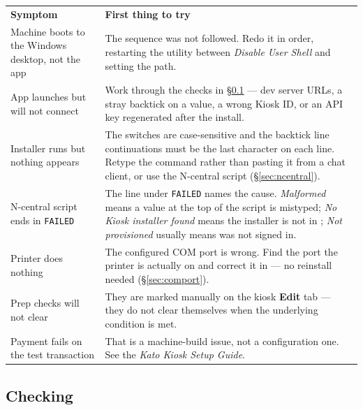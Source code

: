 \documentclass[a4paper,10pt]{article}
\begin{document}
\begin{center}
\renewcommand{\arraystretch}{1.35}\small
\begin{tabularx}{\textwidth}{L{50mm} X}
\color{white}\textbf{Symptom} &
\color{white}\textbf{First thing to try}\\
Machine boots to the Windows desktop, not the app &
The  sequence was not followed. Redo it in order,
restarting the utility between \emph{Disable User Shell} and setting the
path.\\
App launches but will not connect &
Work through the  checks in
\S\ref{sec:identity} --- dev server URLs, a stray backtick on a value, a
wrong Kiosk ID, or an API key regenerated after the install.\\
Installer runs but nothing appears &
The switches are case-sensitive and the backtick line continuations must
be the last character on each line. Retype the command rather than
pasting it from a chat client, or use the N-central script
(\S\ref{sec:ncentral}).\\
N-central script ends in \texttt{FAILED} &
The line under \texttt{FAILED} names the cause. \emph{Malformed} means a
value at the top of the script is mistyped; \emph{No Kiosk installer
found} means the installer is not in
;
\emph{Not provisioned} usually means  was not signed in.\\
Printer does nothing &
The configured COM port is wrong. Find the port the printer is actually
on and correct it in  --- no reinstall needed
(\S\ref{sec:comport}).\\
Prep checks will not clear &
They are marked manually on the kiosk \textbf{Edit} tab --- they do not
clear themselves when the underlying condition is met.\\
Payment fails on the test transaction &
That is a machine-build issue, not a configuration one. See the
\emph{Kato Kiosk Setup Guide}.\\
\end{tabularx}
\end{center}

\subsection{Checking }\label{sec:identity}
\end{document}
